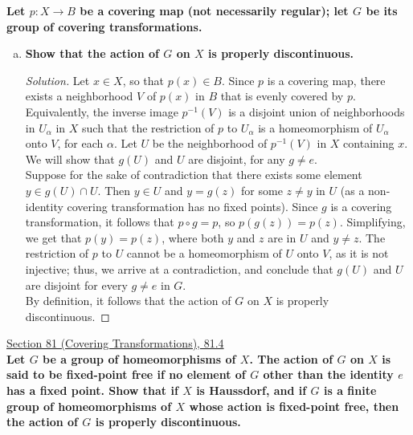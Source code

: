 \documentclass[11pt]{article}
\newenvironment{solution}
  {\renewcommand\qedsymbol{$\blacksquare$}\begin{proof}[Solution]}
  {\end{proof}}
\begin{document}
\textbf{Let $p\colon X \rightarrow B$ be a covering map (not necessarily regular); let $G$ be its group of covering transformations.}
\begin{enumerate}[a)]
    \item \textbf{Show that the action of $G$ on $X$ is properly discontinuous.}
    
    \begin{solution}
    Let $x \in X$, so that $p(x) \in B$. Since $p$ is a covering map, there exists a neighborhood $V$ of $p(x)$ in $B$ that is evenly covered by $p$. 
    Equivalently, the inverse image $p^{-1}(V)$ is a disjoint union of neighborhoods in $U_\alpha$ in $X$ such that the restriction of $p$ to $U_\alpha$ is a homeomorphism of $U_\alpha$ onto $V$, for each $\alpha$. 
    Let $U$ be the neighborhood of $p^{-1}(V)$ in $X$ containing $x$. We will show that $g(U)$ and $U$ are disjoint, for any $g \neq e$. \\

    Suppose for the sake of contradiction that there exists some element $y \in g(U) \cap U$. 
    Then $y \in U$ and $y = g(z)$ for some $z \neq y$ in $U$ (as a non-identity covering transformation has no fixed points). 
    Since $g$ is a covering transformation, it follows that $p \circ g = p$, so $p(g(z)) = p(z)$. Simplifying, we get that
    $p(y) = p(z)$, where both $y$ and $z$ are in $U$ and $y \neq z$. The restriction of $p$ to $U$ cannot be a homeomorphism of $U$ onto $V$, as it is not injective; thus, we arrive at a contradiction,
    and conclude that $g(U)$ and $U$ are disjoint for every $g \neq e$ in $G$. \\

    By definition, it follows that the action of $G$ on $X$ is properly discontinuous.
    \end{solution}
    
\end{enumerate}

\newpage

\underline{Section 81 (Covering Transformations), 81.4} \\

\textbf{Let $G$ be a group of homeomorphisms of $X$. The action of $G$ on $X$ is said to be fixed-point free if no element of $G$ other than the identity $e$ has a fixed point. 
Show that if $X$ is Haussdorf, and if $G$ is a finite group of homeomorphisms of $X$ whose action is fixed-point free, then the action of $G$ is properly discontinuous.}
\end{document}
